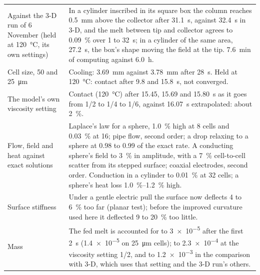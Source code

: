 \documentclass[10pt,a4paper]{article}
\begin{document}
\begin{tabularx}{\textwidth}{@{}>{\raggedright\arraybackslash\sffamily\small}p{4.3cm}L@{}}
\toprule
Against the 3-D run of 6 November (held at \qty{120}{\celsius}, its own settings) &
  In a cylinder inscribed in its square box the column reaches \qty{0.5}{\milli\metre} above the collector
  after \qty{31.1}{\second}, against \qty{32.4}{\second} in 3-D, and the melt between tip and collector
  agrees to \qty{0.09}{\percent} over 1 to \qty{32}{\second}; in a cylinder of the same area,
  \qty{27.2}{\second}, the box's shape moving the field at the tip. \qty{7.6}{\minute} of computing against
  \qty{6.0}{\hour}. \\
Cell size, 50 and \qty{25}{\micro\metre} &
  Cooling: \qty{3.69}{\milli\metre} against \qty{3.78}{\milli\metre} after \qty{28}{\second}. Held at
  \qty{120}{\celsius}: contact after 9.8 and \qty{15.8}{\second}, not converged. \\
The model's own viscosity setting &
  Contact (\qty{120}{\celsius}) after 15.45, 15.69 and \qty{15.80}{\second} as it goes from 1/2 to 1/4 to
  1/6, against \qty{16.07}{\second} extrapolated: about \qty{2}{\percent}. \\
Flow, field and heat against exact solutions &
  Laplace's law for a sphere, \qty{1.0}{\percent} high at 8 cells and \qty{0.03}{\percent} at 16; pipe flow,
  second order; a drop relaxing to a sphere at 0.98 to 0.99 of the exact rate. A conducting sphere's field
  to \qty{3}{\percent} in amplitude, with a \qty{7}{\percent} cell-to-cell scatter from its stepped surface;
  coaxial electrodes, second order.
  Conduction in a cylinder to \qty{0.01}{\percent} at 32 cells; a sphere's heat loss \qtyrange{1.0}{1.2}{\percent}
  high. \\
Surface stiffness &
  Under a gentle electric pull the surface now deflects 4 to \qty{6}{\percent} too far (planar test); before
  the improved curvature used here it deflected 9 to \qty{20}{\percent} too little. \\
Mass &
  The fed melt is accounted for to \num{3e-5} after the first \qty{2}{\second} (\num{1.4e-5} on
  \qty{25}{\micro\metre} cells); to \num{2.3e-4} at the viscosity setting 1/2, and to \num{1.2e-3} in the
  comparison with 3-D, which uses that setting and the 3-D run's others. \\
\bottomrule
\end{tabularx}
\end{document}
